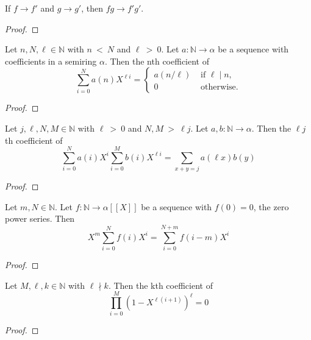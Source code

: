 \begin{theorem}
  \label{thm:eventuallyEq_mul}
  \leanok
  If $f \longrightarrow f'$ and $g \longrightarrow g'$, then $f g \longrightarrow f' g'$.
\end{theorem}
\begin{proof}
  \leanok
\end{proof}


\begin{lemma}
  \label{lem:coeff_sum_X_pow_mul}
  \leanok
  Let $n, N, \ell \in \mathbb{N}$ with $n \: < \: N$ and $\ell \: > \: 0$. Let $a : \mathbb{N} \to \alpha$ be a sequence with coefficients in a semiring $\alpha$.
  Then the nth coefficient of 
  \[ \sum_{i = 0}^{N} a (n) X ^ {\ell i} = 
      \begin{cases}
        a (n / \ell) & \text{ if } \ell \mid n, \\
        0 & \text{ otherwise.}
      \end{cases} \]

\end{lemma}
\begin{proof}
  \leanok
\end{proof}


\begin{lemma}
  \label{lem:coeff_sum_squash}
  \leanok
  Let $j, \ell, N, M \in \mathbb{N}$ with $\ell \: > \: 0$ and $N, M \: > \: \ell j$. 
  Let $a, b : \mathbb{N} \to \alpha$. Then the $\ell j$ th coefficient of
  \[ \sum_{i = 0}^{N} a (i) X ^ i \sum_{i = 0}^{M} b (i) X ^ {\ell i} = 
      \sum_{x + y = j} a (\ell x) b (y) \] 
\end{lemma}
\begin{proof}
  \leanok
\end{proof}


\begin{lemma}
  \label{lem:coeff_mul_shift_of_zero}
  \leanok
  Let $m, N \in \mathbb{N}$. Let $f : \mathbb{N} \to \alpha [[X]]$ be a sequence 
  with $f(0) = 0$, the zero power series. Then
  \[ X ^ m \sum_{i = 0}^{N} f (i) X ^ i = \sum_{i = 0}^{N + m} f (i - m) X ^ i \]
\end{lemma}
\begin{proof}
  \leanok
\end{proof}


\begin{lemma}
  \label{lem:coeff_zero_of_ndvd}
  \leanok
  Let $M, \ell, k \in \mathbb{N}$ with $\ell \nmid k$. Then the kth coefficient of 
  \[ \prod_{i = 0}^{M} (1 - X ^ {\ell (i + 1)}) ^ \ell = 0 \]
\end{lemma}
\begin{proof}
  \leanok
\end{proof}

